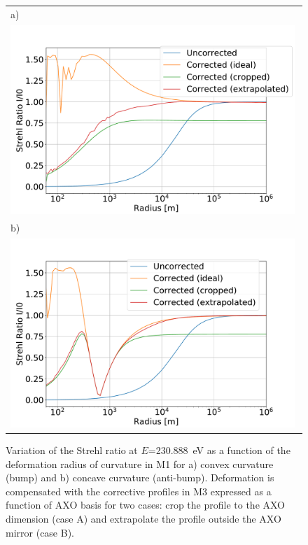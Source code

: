 \documentclass{iucr}
\newcommand{\todo}[1]{{\color{red}[TODO: "#1'']}}
\begin{document}
 

  \begin{figure}
  \label{fig:strehlRatioVersusR} 
  \begin{center}
  \begin{tabular}{l} 
  a)\\
  \includegraphics[width=0.99\textwidth]{figures/scan_peak_vs_negative_radius.pdf}\\
  b)\\
  \includegraphics[width=0.99\textwidth]{figures/scan_peak_vs_positive_radius.pdf} 
  
  \end{tabular}
  \end{center}
  \caption{
Variation of the Strehl ratio at $E$=230.888~eV as a function of the deformation radius of curvature in M1 for a) convex curvature (bump) and b) concave curvature (anti-bump). Deformation is compensated with the corrective profiles in M3 expressed as a function of AXO basis for two cases: crop the profile to the AXO dimension (case A) and extrapolate the profile outside the AXO mirror (case B).}
  \end{figure} 
\end{document}
